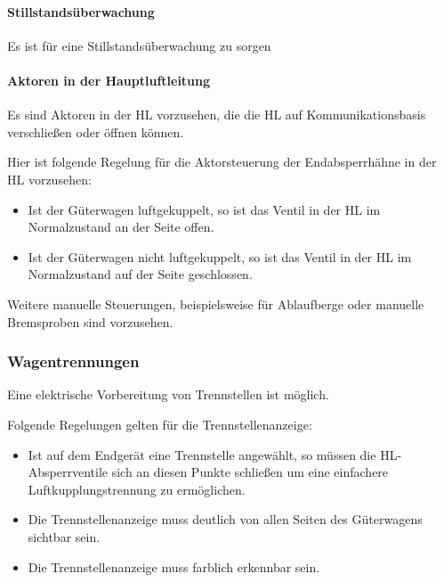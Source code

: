 \paragraph{Stillstandsüberwachung}
\begin{feat}
Es ist für eine Stillstandsüberwachung zu sorgen
\end{feat}

\paragraph{Aktoren in der Hauptluftleitung}
\begin{feat}
Es sind Aktoren in der HL vorzusehen, die die HL auf Kommunikationsbasis verschließen oder öffnen können.
\end{feat}
\begin{rem} [zu Anf. 20]
Hier ist folgende Regelung für die Aktorsteuerung der Endabsperrhähne in der HL vorzusehen:
\begin{itemize}
    \item Ist der Güterwagen luftgekuppelt, so ist das Ventil in der HL im Normalzustand an der Seite offen.
    \item Ist der Güterwagen nicht luftgekuppelt, so ist das Ventil in der HL im Normalzustand auf der Seite geschlossen.
\end{itemize}
\end{rem}
\begin{rem} [zu Anf. 20]
Weitere manuelle Steuerungen, beispielsweise für Ablaufberge oder manuelle Bremsproben sind vorzusehen.
\end{rem}

\subsubsection{Wagentrennungen}
\begin{feat}
Eine elektrische Vorbereitung von Trennstellen ist möglich.
\end{feat}
\begin{rem} [zu Anf. 21]
Folgende Regelungen gelten für die Trennstellenanzeige:
\begin{itemize}
    \item Ist auf dem Endgerät eine Trennstelle angewählt, so müssen die HL-Absperrventile sich an diesen Punkte schließen um eine einfachere Luftkupplungstrennung zu ermöglichen.
    \item Die Trennstellenanzeige muss deutlich von allen Seiten des Güterwagens sichtbar sein.
    \item Die Trennstellenanzeige muss farblich erkennbar sein.
\end{itemize}
\end{rem}

